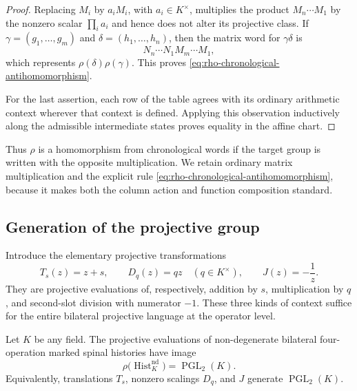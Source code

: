\begin{proof}
Replacing $M_i$ by $a_iM_i$, with $a_i\in K^\times$, multiplies the product
$M_n\cdots M_1$ by the nonzero scalar $\prod_i a_i$ and hence does not alter
its projective class.  If
$\gamma=(g_1,\ldots,g_m)$ and $\delta=(h_1,\ldots,h_n)$, then the matrix word
for $\gamma\delta$ is
\[
  N_n\cdots N_1M_m\cdots M_1,
\]
which represents $\rho(\delta)\rho(\gamma)$.  This proves
\eqref{eq:rho-chronological-antihomomorphism}.

For the last assertion, each row of the table agrees with its ordinary
arithmetic context wherever that context is defined.  Applying this observation
inductively along the admissible intermediate states proves equality in the
affine chart.
\end{proof}

Thus $\rho$ is a homomorphism from chronological words if the target group is
written with the opposite multiplication.  We retain ordinary matrix
multiplication and the explicit rule
\eqref{eq:rho-chronological-antihomomorphism}, because it makes both the column
action and function composition standard.

\subsection{Generation of the projective group}

Introduce the elementary projective transformations
\[
  T_s(z)=z+s,
  \qquad
  D_q(z)=qz\quad(q\in K^\times),
  \qquad
  J(z)=-\frac1z.
\]
They are projective evaluations of, respectively, addition by $s$,
multiplication by $q$, and second-slot division with numerator $-1$.  These
three kinds of context suffice for the entire bilateral projective language at
the operator level.

\begin{theorem}
\label{thm:bilateral-pgl2-generation}
Let $K$ be any field.  The projective evaluations of non-degenerate bilateral
four-operation marked spinal histories have image
\[
  \rho\bigl(\operatorname{Hist}^{\mathrm{nd}}_K\bigr)
  =\operatorname{PGL}_2(K).
\]
Equivalently, translations $T_s$, nonzero
scalings $D_q$, and $J$ generate $\operatorname{PGL}_2(K)$.
\end{theorem}

